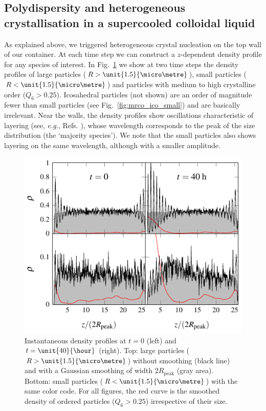 \documentclass[8.5pt,twoside,twocolumn]{article}
\begin{document}
\subsection{Polydispersity and heterogeneous crystallisation in a supercooled colloidal liquid}


As explained above, we triggered heterogeneous crystal nucleation on the top wall of our container. At each time step we can construct a $z$-dependent density profile for any species of interest. In Fig.~\ref{fig:profiles} we show at two time steps the density profiles of large particles ($R>\unit{1.5}{\micro\metre}$), small particles ($R<\unit{1.5}{\micro\metre}$) and particles with medium to high crystalline order ($Q_6>0.25$). Icosahedral particles (not shown) are an order of magnitude fewer than small particles (see Fig.~\ref{fig:mrco_ico_small}) and are basically irrelevant. Near the walls, the density profiles show oscillations characteristic of layering 
(see, \emph{e.g.}, Refs. \cite{watanabe2011,kob3}), whose wavelength corresponds to the peak of the size distribution (the `majority species'). We note that the small particles also shows layering on the same wavelength, although with a smaller amplitude.

\begin{figure}
	\centering
	\includegraphics{fig_profiles.pdf}
	\caption{Instantaneous density profiles at $t=0$ (left) and $t=\unit{40}{\hour}$ (right). Top: large particles ($R>\unit{1.5}{\micro\metre}$) without smoothing (black line) and with a Gaussian smoothing of width $2R_\text{peak}$ (gray area). Bottom: small particles ($R<\unit{1.5}{\micro\metre}$) with the same color code. 
For all figures, the red curve is the smoothed density of ordered particles ($Q_6>0.25$) irrespective of their size.}
	\label{fig:profiles}
\end{figure}
\end{document}
